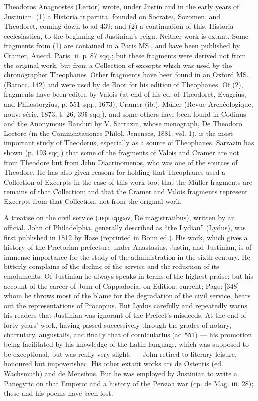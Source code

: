 Theodoros Anagnostes (Lector) wrote, under Justin and in the early years of Justinian, (1) a Historia tripartita, founded on Socrates, Sozomen, and Theodoret, coming down to ad 439; and (2) a continuation of this, Historia ecclesiastica, to the beginning of Justinian\texthebrew{}’s reign. Neither work is extant. Some fragments from (1) are contained in a Paris MS., and have been published by Cramer, Anecd. Paris. ii. p. 87 sqq.; but these fragments were derived not from the original work, but from a Collection of excerpts which was used by the chronographer Theophanes. Other fragments have been found in an Oxford MS. (Barocc. 142) and were used by de Boor for his edition of Theophanes. Of (2), fragments have been edited by Valois (at end of his ed. of Theodoret, Evagrius, and Philostorgius, p. 551 sqq., 1673), Cramer (ib.), Müller (Revue Archéologique, nouv. série, 1873, t. 26, 396 sqq.), and some others have been found in Codinus and the Anonymous Banduri by V. Sarrazin, whose monograph, De Theodoro Lectore (in the Commentationes Philol. Jenenses, 1881, vol. 1), is the most important study of Theodorus, especially as a source of Theophanes. Sarrazin has shown (p. 193 sqq.) that some of the fragments of Valois and Cramer are not from Theodore but from John Diacrinomenos, who was one of the sources of Theodore. He has also given reasons for holding that Theophanes used a Collection of Excerpts in the case of this work too; that the Müller fragments are remains of that Collection; and that the Cramer and Valois fragments represent Excerpts from that Collection, not from the original work.

A treatise on the civil service (\textgreek{περι αρχων}, De magistratibus), written by an official, John of Philadelphia, generally described as \texthebrew{“}the Lydian\texthebrew{}” (Lydus), was first published in 1812 by Hase (reprinted in Bonn ed.). His work, which gives a history of the Prætorian prefecture under Anastasius, Justin, and Justinian, is of immense importance for the study of the administration in the sixth century. He bitterly complains of the decline of the service and the reduction of its emoluments. Of Justinian he always speaks in terms of the highest praise; but his account of the career of John of Cappadocia, on Edition: current; Page: [348] whom he throws most of the blame for the degradation of the civil service, bears out the representations of Procopius. But Lydus carefully and repeatedly warns his readers that Justinian was ignorant of the Prefect\texthebrew{}’s misdeeds. At the end of forty years\texthebrew{}’ work, having passed successively through the grades of notary, chartulary, augustalis, and finally that of cornicularius (ad 551) \texthebrew{—} his promotion being facilitated by his knowledge of the Latin language, which was supposed to be exceptional, but was really very slight, \texthebrew{—} John retired to literary leisure, honoured but impoverished. His other extant works are de Ostentis (ed. Wachsmuth) and de Mensibus. But he was employed by Justinian to write a Panegyric on that Emperor and a history of the Persian war (cp. de Mag. iii. 28); these and his poems have been lost.

